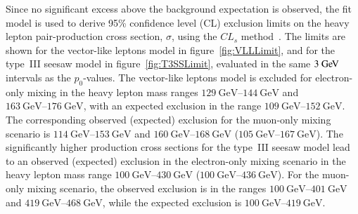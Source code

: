 Since no significant excess above the background expectation is observed, the fit model is used to derive 95\% confidence level (CL) exclusion limits on the heavy lepton pair-production cross section, $\sigma$, using the $CL_s$ method~\cite{cls}. The limits are shown for the vector-like leptons model in figure~\ref{fig:VLLLimit}, and for the type~III seesaw model in figure~\ref{fig:T3SSLimit}, evaluated in the same $3 \GeV$ intervals as the $p_0$-values.
The vector-like leptons model is excluded for electron-only mixing in the heavy lepton mass ranges $\SIrange[range-phrase=-]{129}{144}{\giga\electronvolt}$ and $\SIrange[range-phrase=-]{163}{176}{\giga\electronvolt}$, with an expected exclusion in the range $\SIrange[range-phrase=-]{109}{152}{\giga\electronvolt}$. The corresponding observed (expected) exclusion for the muon-only mixing scenario is $\SIrange[range-phrase=-]{114}{153}{\giga\electronvolt}$ and $\SIrange[range-phrase=-]{160}{168}{\giga\electronvolt}$ ($\SIrange[range-phrase=-]{105}{167}{\giga\electronvolt}$).
The significantly higher production cross sections for the type~III seesaw model lead to an observed (expected) exclusion in the electron-only mixing scenario in the heavy lepton mass range $\SIrange[range-phrase=-]{100}{430}{\giga\electronvolt}$  ($\SIrange[range-phrase=-]{100}{436}{\giga\electronvolt}$). For the muon-only mixing scenario, the observed exclusion is in the ranges $\SIrange[range-phrase=-]{100}{401}{\giga\electronvolt}$ and $\SIrange[range-phrase=-]{419}{468}{\giga\electronvolt}$, while the expected exclusion is $\SIrange[range-phrase=-]{100}{419}{\giga\electronvolt}$.

